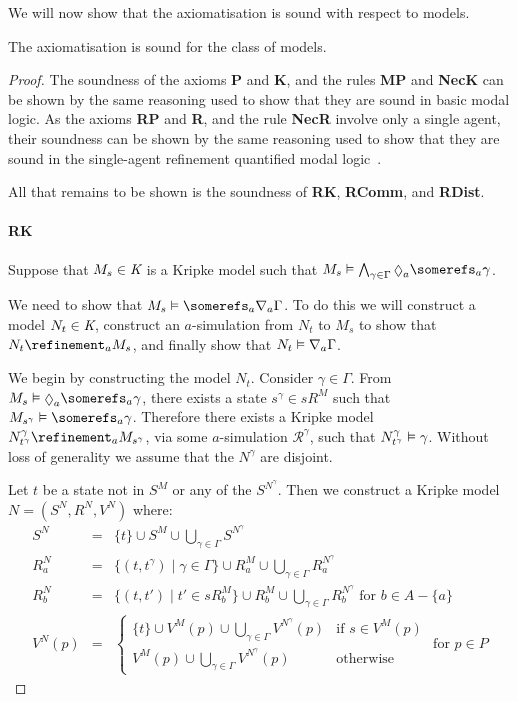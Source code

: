 We will now show that the axiomatisation is sound with respect to \classK{}
models.

\begin{lemma}\label{k-sound}
The axiomatisation \axiomKF{} is sound for the class of \classK{} models.
\end{lemma}

\begin{proof}
The soundness of the axioms {\bf P} and {\bf K}, and the rules {\bf MP} and
{\bf NecK} can be shown by the same reasoning used to show that they are sound
in basic modal logic. As the axioms {\bf RP} and {\bf R}, and the rule {\bf
NecR} involve only a single agent, their soundness can be shown by the same
reasoning used to show that they are sound in the single-agent refinement
quantified modal logic~\cite{french2010future}.

All that remains to be shown is the soundness of {\bf RK}, {\bf RComm}, and {\bf
RDist}.

\paragraph{RK}
Suppose that $M_s \in \textit{K}$ is a Kripke model such that $M_s \entails
\bigwedge_{\gamma \in \Gamma} \suspects_a \somerefs_a \gamma$.

We need to show that $M_s \entails \somerefs_a \covers_a \Gamma$. To do this we
will construct a model $N_t \in \textit{K}$, construct an $a$-simulation from $N_t$
to $M_s$ to show that $N_t \refinement_a M_s$, and finally show that $N_t
\vDash \nabla_a \Gamma$.

We begin by constructing the model $N_t$. Consider $\gamma \in \Gamma$. From
$M_s \entails \suspects_a \somerefs_a \gamma$, there exists a state $s^\gamma
\in sR^M$ such that $M_{s^\gamma} \entails \somerefs_a \gamma$. Therefore there
exists a Kripke model $N^\gamma_{t^\gamma} \refinement_a M_{s^\gamma}$, via some
$a$-simulation $\mathcal{R}^\gamma$, such that $N^\gamma_{t^\gamma} \vDash
\gamma$. Without loss of generality we assume that the $N^\gamma$ are disjoint.

Let $t$ be a state not in $S^M$ or any of the $S^{N^\gamma}$. Then we construct a
Kripke model $N = (S^N, R^N, V^N)$ where:
\begin{eqnarray*}
S^N &=& \{t\} \cup S^M \cup \bigcup_{\gamma \in \Gamma} S^{N^\gamma}\\
R^N_a &=& \{(t, t^\gamma) \mid \gamma \in \Gamma\}
\cup R^M_a
\cup \bigcup_{\gamma \in \Gamma} R^{N^\gamma}_a\\
R^N_b &=& \{(t, t') \mid t' \in sR^M_b\}
\cup R^M_b
\cup \bigcup_{\gamma \in \Gamma} R^{N^\gamma}_b \text{ for $b \in A - \{a\}$}\\
V^N(p) &=& 
\begin{cases}
\displaystyle \{t\} \cup V^M(p) \cup \bigcup_{\gamma \in \Gamma} V^{N^\gamma}(p) & \text{if $s
\in V^M(p)$}\\
\displaystyle V^M(p) \cup \bigcup_{\gamma \in \Gamma} V^{N^\gamma}(p) & \text{otherwise}
\end{cases}
\text{ for $p \in P$}
\end{eqnarray*}


\end{proof}
